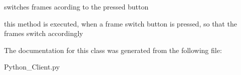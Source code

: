 switches frames acording to the pressed button 

this method is executed, when a frame switch button is pressed, so that the frames switch accordingly 

The documentation for this class was generated from the following file\+:\begin{DoxyCompactItemize}
\item 
Python\+\_\+\+Client.\+py\end{DoxyCompactItemize}
